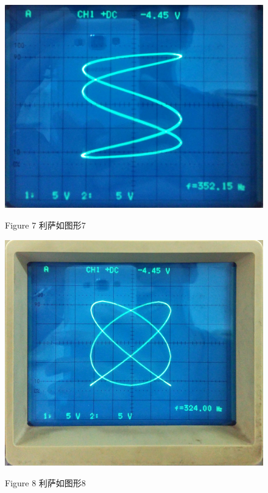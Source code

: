 \documentclass[a4paper,10pt,notitlepage]{report}
\begin{document}
\begin{figure}[htbp]
\centering

	\includegraphics[scale=.1]{L07.jpg}
	\begin{center}
		\scriptsize Figure 7 利萨如图形7
	\end{center}

\end{figure}
	
\begin{figure}[htbp]
\centering

	\includegraphics[scale=.1]{L08.jpg}
	\begin{center}
		\scriptsize Figure 8 利萨如图形8
	\end{center}

\end{figure}
	
\end{document}
